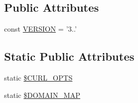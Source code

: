 \subsection*{Public Attributes}
\begin{DoxyCompactItemize}
\item 
const \hyperlink{class_base_facebook_ae0ee825ecd33e197a890c9b47ee14bd8}{V\-E\-R\-S\-I\-O\-N} = '3..'
\end{DoxyCompactItemize}
\subsection*{Static Public Attributes}
\begin{DoxyCompactItemize}
\item 
static \hyperlink{class_base_facebook_ad48ad58bc8120acf03f199bb100be6dd}{\$\-C\-U\-R\-L\-\_\-\-O\-P\-T\-S}
\item 
static \hyperlink{class_base_facebook_a154dee18518e85547854c5d51f77e314}{\$\-D\-O\-M\-A\-I\-N\-\_\-\-M\-A\-P}
\end{DoxyCompactItemize}
